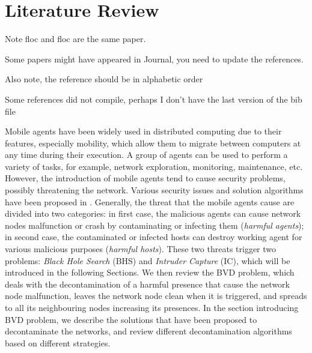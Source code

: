 \chapter {Literature Review}
\label{RW}


\color{blue}
Note {floc} and {floc} are the same paper.

Some papers might have appeared in Journal, you need to update the references.

Also note, the reference should be in alphabetic order

Some references did not compile, perhaps I don't have the last version of the bib file

\color{black}
Mobile agents have been widely used in  distributed computing due to their features, especially   mobility, which allow them to migrate between computers at any time during their execution. A group of agents can be used to perform a variety of tasks, for example, network exploration, monitoring,  maintenance,   etc. However, the introduction of mobile agents tend to cause security problems, possibly  threatening the network. Various security issues and solution algorithms have been proposed  in \cite{security}. Generally, the threat  that the mobile agents cause are divided into two categories: in first case, the malicious agents can cause network nodes malfunction or crash by contaminating or infecting them ({\em harmful agents}); in second case, the contaminated or infected hosts can destroy working agent for various malicious purposes ({\em harmful hosts}). These two threats trigger two problems: {\em Black Hole Search } (BHS) and {\em Intruder Capture} (IC), which will be introduced in the following Sections. We then  review the BVD problem, which deals with the decontamination of a harmful presence that cause the network node malfunction, leaves the network node clean when it is triggered, and spreads to all its neighbouring nodes increasing its presences. In the section introducing BVD problem, we describe the solutions that have been proposed to decontaminate the networks, and review different decontamination algorithms based on different strategies.

